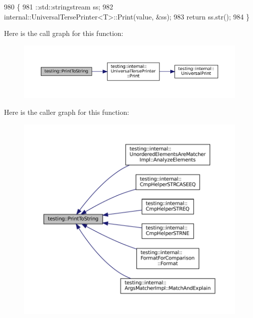 \begin{DoxyCode}
980                                         \{
981   ::std::stringstream ss;
982   internal::UniversalTersePrinter<T>::Print(value, &ss);
983   \textcolor{keywordflow}{return} ss.str();
984 \}
\end{DoxyCode}
Here is the call graph for this function\+:
\nopagebreak
\begin{figure}[H]
\begin{center}
\leavevmode
\includegraphics[width=350pt]{namespacetesting_aa5717bb1144edd1d262d310ba70c82ed_cgraph}
\end{center}
\end{figure}
Here is the caller graph for this function\+:
\nopagebreak
\begin{figure}[H]
\begin{center}
\leavevmode
\includegraphics[width=350pt]{namespacetesting_aa5717bb1144edd1d262d310ba70c82ed_icgraph}
\end{center}
\end{figure}
\mbox{\label{namespacetesting_a0fad10571e23f7bc0d5c83d4c31ba740}} 
